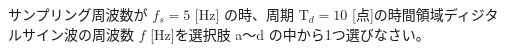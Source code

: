 サンプリング周波数が $f_s = 5$ [Hz] の時、周期 $\textrm{T}_d = 10$ [点]の時間領域ディジタルサイン波の周波数 $f$ [Hz]を選択肢 a〜d の中から1つ選びなさい。
